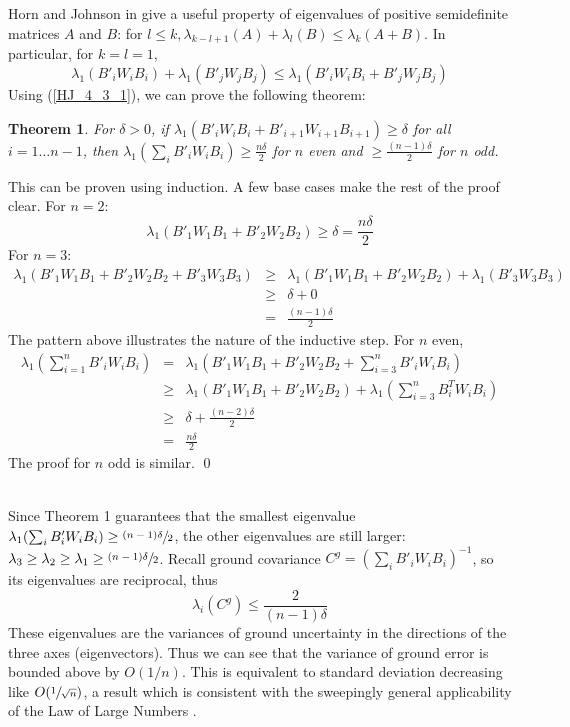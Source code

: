 \documentclass[10pt]{amsart}
\newcommand{\btwbi}{B'_iW_iB_i}
\newcommand{\btwbii}{B'_{i+1}W_{i+1}B_{i+1}}
\newcommand{\btwbj}{B'_jW_jB_j}
\newcommand{\btwbone}{B'_1W_1B_1}
\newcommand{\btwbtwo}{B'_2W_2B_2}
\newcommand{\btwbthr}{B'_3W_3B_3}
\newtheorem{theorem}{Theorem}
\begin{document}
Horn and Johnson in \cite{H_AND_J} give a useful property of eigenvalues of positive semidefinite
matrices $A$ and $B$: for $l\le k,
\lambda_{k-l+1}(A)+\lambda_l(B)\leq\lambda_k(A+B)$.
In particular, for $k=l=1$,
\begin{equation}\label{HJ_4_3_1}
\lambda_1(\btwbi)+\lambda_1(\btwbj) \le \lambda_1(\btwbi+\btwbj)
\end{equation}
%
Using (\ref{HJ_4_3_1}), we can prove the following theorem:

\begin{theorem} \label{theorem_1}
  For $\delta>0$, if $\lambda_1(\btwbi+\btwbii) \geq \delta$ for all $i= 1\dots
  n-1$, then $\lambda_1(\sum_i\btwbi) \geq \frac{n\delta}{2}$ for $n$ even and
  $\geq \frac{(n-1)\delta}{2}$ for $n$ odd.
\end{theorem}

This can be proven using induction. A few base cases make the rest of the proof
clear. For $n=2$:
$$\lambda_1(\btwbone + \btwbtwo) \geq \delta = \frac{n\delta}{2}$$ For $n=3$: 
\begin{eqnarray*}
\lambda_1(\btwbone + \btwbtwo + \btwbthr) & \geq& 
     \lambda_1(\btwbone+\btwbtwo) + \lambda_1(\btwbthr) \\
     &\geq& \delta + 0 \\
     &=& \frac{(n-1)\delta}{2}
\end{eqnarray*}
%
The pattern above illustrates the nature of the inductive step. For $n$ even,
\begin{eqnarray*}
\lambda_1(\sum^n_{i=1}\btwbi) &=&\lambda_1(\btwbone + \btwbtwo + \sum_{i=3}^n \btwbi)\\
&\geq&\lambda_1(\btwbone+\btwbtwo) + \lambda_1(\sum_{i=3}^n B^T_iW_iB_i) \\
&\geq&\delta + \frac{(n-2)\delta}{2} \\
& = & \frac{n\delta}{2}
\end{eqnarray*}
%
The proof for $n$ odd is similar. \qed

\ \\

Since Theorem 1 guarantees that the smallest eigenvalue
$\lambda_1(\sum_i\btwbi)\geq\sfrac{(n-1)\delta}{2}$, the other eigenvalues are
still larger: $\lambda_3 \geq \lambda_2 \geq \lambda_1 \geq
\sfrac{(n-1)\delta}{2}$. Recall ground covariance $C^g=(\sum_i\btwbi)^{-1}$, so its
eigenvalues are reciprocal, thus 
\begin{equation}\label{C_evals}
\lambda_i(C^g)\leq \frac{2}{(n-1)\delta}
\end{equation}
These eigenvalues are the variances of ground uncertainty in the directions of
the three axes (eigenvectors). Thus we can see that the variance of ground error
is bounded above by $O(1/n)$. This is equivalent to standard deviation
decreasing like $O(\sfrac{1}{\sqrt{n}})$, a result which is consistent with the
sweepingly general applicability of the Law of Large Numbers \cite{LLN}.
\end{document}
